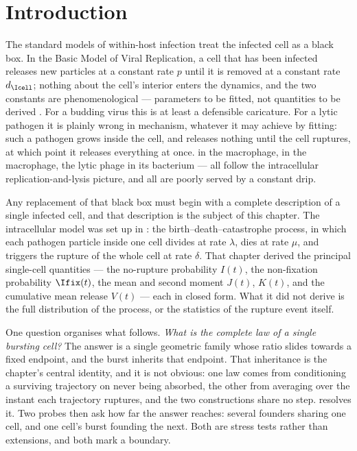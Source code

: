 \section{Introduction}
\label{dist:sec:intro}

The standard models of within-host infection treat the infected cell as a
black box. In the Basic Model of Viral Replication, a cell that has been
infected releases new particles at a constant rate $p$ until it is removed
at a constant rate $d_{\Icell}$; nothing about the cell's interior enters
the dynamics, and the two constants are phenomenological --- parameters to
be fitted, not quantities to be derived
\cite{perelson1996hiv,nowak1996population,mclean1993balance}. For a budding
virus this is at least a defensible caricature. For a lytic pathogen it is
plainly wrong in mechanism, whatever it may achieve by fitting: such a
pathogen grows inside the cell, and releases nothing until the cell ruptures,
at which point it releases everything at once. \yp{} in the macrophage,
\ft{} in the macrophage, the lytic phage in its bacterium --- all follow the
intracellular replication-and-lysis picture, and all are poorly served by a
constant drip.

Any replacement of that black box must begin with a complete description of
a single infected cell, and that description is the subject of this chapter.
The intracellular model was set up in \ChCore: the
birth--death--catastrophe process, in which each pathogen particle inside one
cell divides at rate $\lambda$, dies at rate $\mu$, and triggers the rupture
of the whole cell at rate $\delta$. That chapter derived the principal
single-cell quantities --- the no-rupture probability $I(t)$, the non-fixation
probability $\Ifix(t)$, the mean and second moment $J(t)$, $K(t)$, and the
cumulative mean release $V(t)$ --- each in closed form. What it did not derive
is the full distribution of the process, or the statistics of the rupture
event itself.

One question organises what follows. \emph{What is the complete law of a
single bursting cell?} The answer is a single geometric family whose ratio
slides towards a fixed endpoint, and the burst inherits that endpoint. That
inheritance is the chapter's central identity, and it is not obvious: one law
comes from conditioning a surviving trajectory on never being absorbed, the
other from averaging over the instant each trajectory ruptures, and the two
constructions share no step.  resolves it. Two
probes then ask how far the answer reaches: several founders sharing one cell,
and one cell's burst founding the next. Both are stress tests rather than
extensions, and both mark a boundary.


